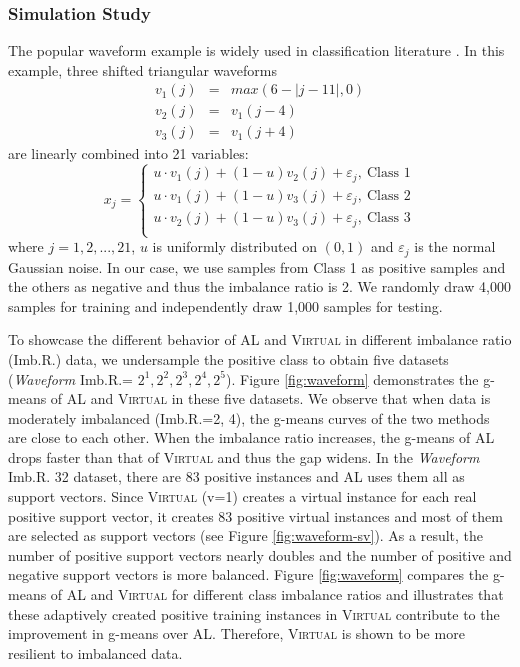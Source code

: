\subsubsection{Simulation Study}\label{early_stop}
The popular waveform example is widely used in classification literature \cite{Breiman84}. In this example, three shifted triangular waveforms
\begin{eqnarray*}
v_1(j)&=&max(6-|j-11|,0)\\
v_2(j)&=&v_1(j-4)\\
v_3(j)&=&v_1(j+4)
\end{eqnarray*}
are linearly combined into 21 variables:
\[
x_j  = \left\{ \begin{array}{l}
 u \cdot v_1 (j) + (1 - u)v_2 (j) + \varepsilon _j,\ \mbox{Class 1}  \\
 u \cdot v_1 (j) + (1 - u)v_3 (j) + \varepsilon _j,\ \mbox{Class 2}  \\
 u \cdot v_2 (j) + (1 - u)v_3 (j) + \varepsilon _j,\ \mbox{Class 3} \\
 \end{array} \right.
\]
where $ j=1,2,...,21$, $u$ is uniformly distributed on $(0,1)$ and $\varepsilon _j$ is the normal Gaussian noise. In our case, we use samples from Class 1 as positive samples and the others as negative and thus the imbalance ratio is 2. We randomly draw 4,000 samples for training and independently draw 1,000 samples for testing.

To showcase the different behavior of AL and \textsc{Virtual} in different imbalance ratio (Imb.R.) data, we undersample the positive class to obtain five datasets (\emph{Waveform} Imb.R.= $2^1, 2^2, 2^3, 2^4, 2^5$). Figure \ref{fig:waveform} demonstrates the g-means of AL and \textsc{Virtual} in these five datasets. We observe that when data is moderately imbalanced (Imb.R.=2, 4), the g-means curves of the two methods are close to each other. When the imbalance ratio increases, the g-means of AL drops faster than that of \textsc{Virtual} and thus the gap widens. In the \emph{Waveform} Imb.R. 32 dataset, there are 83 positive instances and AL uses them all as support vectors. Since \textsc{Virtual} (v=1) creates a virtual instance for each real positive support vector, it creates 83 positive virtual instances and most of them are selected as support vectors (see Figure \ref{fig:waveform-sv}). As a result, the number of positive support vectors nearly doubles and the number of positive and negative support vectors is more balanced. Figure \ref{fig:waveform} compares the g-means of AL and \textsc{Virtual} for different class imbalance ratios and illustrates that these adaptively created positive training instances in \textsc{Virtual} contribute to the improvement in g-means over AL. Therefore, \textsc{Virtual} is shown to be more resilient to imbalanced data.

